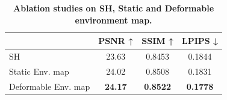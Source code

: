 \begin{table}[t]
\centering
\small
\caption{\textbf{Ablation studies on SH, Static and Deformable environment map.}}
\label{tab:abalation_sh}
\vspace{-2mm}
\begin{tabular}{lccc}
    \toprule
      & PSNR ↑ & SSIM ↑ & LPIPS ↓ \\
    \midrule
    SH &23.63  &0.8453  &0.1844  \\
    Static Env. map &24.02  &0.8508  &0.1831  \\
    Deformable Env. map &\textbf{24.17}  &\textbf{0.8522}  &\textbf{0.1778}  \\
    \bottomrule
\end{tabular}
\end{table}
